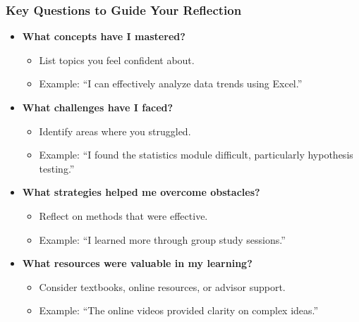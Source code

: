 \documentclass[aspectratio=169]{beamer}
\begin{document}
\begin{frame}[fragile]
    \frametitle{Key Questions to Guide Your Reflection}
    
    \begin{itemize}
        \item \textbf{What concepts have I mastered?}
        \begin{itemize}
            \item List topics you feel confident about.
            \item Example: ``I can effectively analyze data trends using Excel.''
        \end{itemize}
        
        \item \textbf{What challenges have I faced?}
        \begin{itemize}
            \item Identify areas where you struggled.
            \item Example: ``I found the statistics module difficult, particularly hypothesis testing.''
        \end{itemize}
        
        \item \textbf{What strategies helped me overcome obstacles?}
        \begin{itemize}
            \item Reflect on methods that were effective.
            \item Example: ``I learned more through group study sessions.''
        \end{itemize}
        
        \item \textbf{What resources were valuable in my learning?}
        \begin{itemize}
            \item Consider textbooks, online resources, or advisor support.
            \item Example: ``The online videos provided clarity on complex ideas.''
        \end{itemize}
    \end{itemize}
\end{frame}
\end{document}
